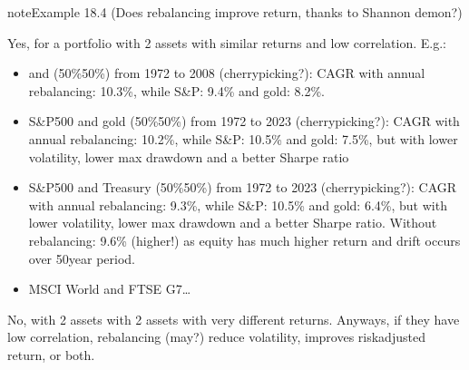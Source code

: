 \documentclass[letterpaper,10pt,english]{jupyterBook}
\begin{document}
\begin{sphinxadmonition}{note}{Example 18.4 (Does rebalancing improve return, thanks to Shannon demon?)}



\sphinxAtStartPar
Yes, for a portfolio with 2 assets with similar returns and low correlation.
E.g.:
\begin{itemize}
\item {} 
\sphinxAtStartPar
{} and  (50\%\sphinxhyphen{}50\%) from 1972 to 2008 (cherry\sphinxhyphen{}picking?): CAGR with annual rebalancing: 10.3\%, while S\&P: 9.4\% and gold: 8.2\%.

\item {} 
\sphinxAtStartPar
S\&P500 and gold (50\%\sphinxhyphen{}50\%) from 1972 to 2023 (cherry\sphinxhyphen{}picking?): CAGR with annual rebalancing: 10.2\%, while S\&P: 10.5\% and gold: 7.5\%, but with lower volatility, lower max drawdown and a better Sharpe ratio

\item {} 
\sphinxAtStartPar
S\&P500 and Treasury (50\%\sphinxhyphen{}50\%) from 1972 to 2023 (cherry\sphinxhyphen{}picking?): CAGR with annual rebalancing: 9.3\%, while S\&P: 10.5\% and gold: 6.4\%, but with lower volatility, lower max drawdown and a better Sharpe ratio. Without rebalancing: 9.6\% (higher!) as equity has much higher return and drift occurs over 50\sphinxhyphen{}year period.

\item {} 
\sphinxAtStartPar
MSCI World and FTSE G7…

\end{itemize}

\sphinxAtStartPar
No, with 2 assets with 2 assets with very different returns. Anyways, if they have low correlation, rebalancing (may?) reduce volatility, improves risk\sphinxhyphen{}adjusted return, or both.
\end{sphinxadmonition}
\end{document}
